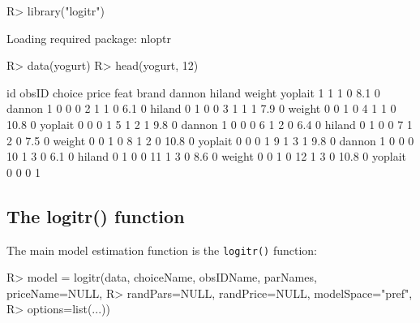\documentclass[article]{jss}
\begin{document}
\begin{CodeChunk}

\begin{CodeInput}
R> library("logitr")
\end{CodeInput}

\begin{CodeOutput}
Loading required package: nloptr
\end{CodeOutput}

\begin{CodeInput}
R> data(yogurt)
R> head(yogurt, 12)
\end{CodeInput}

\begin{CodeOutput}
   id obsID choice price feat   brand dannon hiland weight yoplait
1   1     1      0   8.1    0  dannon      1      0      0       0
2   1     1      0   6.1    0  hiland      0      1      0       0
3   1     1      1   7.9    0  weight      0      0      1       0
4   1     1      0  10.8    0 yoplait      0      0      0       1
5   1     2      1   9.8    0  dannon      1      0      0       0
6   1     2      0   6.4    0  hiland      0      1      0       0
7   1     2      0   7.5    0  weight      0      0      1       0
8   1     2      0  10.8    0 yoplait      0      0      0       1
9   1     3      1   9.8    0  dannon      1      0      0       0
10  1     3      0   6.1    0  hiland      0      1      0       0
11  1     3      0   8.6    0  weight      0      0      1       0
12  1     3      0  10.8    0 yoplait      0      0      0       1
\end{CodeOutput}
\end{CodeChunk}

\hypertarget{the-logitr-function}{%
\subsection{The logitr() function}\label{the-logitr-function}}

The main model estimation function is the \texttt{logitr()} function:

\begin{CodeChunk}

\begin{CodeInput}
R> model = logitr(data, choiceName, obsIDName, parNames, priceName=NULL,
R>             randPars=NULL, randPrice=NULL, modelSpace="pref",
R>             options=list(...))
\end{CodeInput}
\end{CodeChunk}
\end{document}
